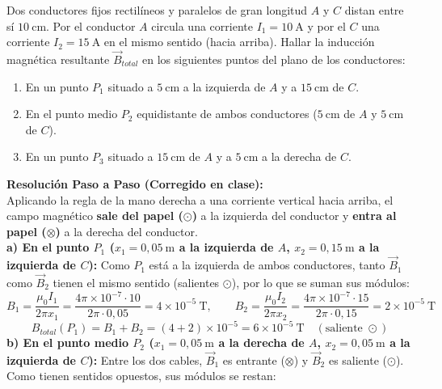 \begin{ejercicio}
Dos conductores fijos rectilíneos y paralelos de gran longitud $A$ y $C$ distan entre sí $10\ \si{\centi\meter}$. Por el conductor $A$ circula una corriente $I_1 = 10\ \si{\ampere}$ y por el $C$ una corriente $I_2 = 15\ \si{\ampere}$ en el mismo sentido (hacia arriba). Hallar la inducción magnética resultante $\vec{B}_{total}$ en los siguientes puntos del plano de los conductores:
\begin{enumerate}[label=\alph*)]
    \item En un punto $P_1$ situado a $5\ \si{\centi\meter}$ a la izquierda de $A$ y a $15\ \si{\centi\meter}$ de $C$.
    \item En el punto medio $P_2$ equidistante de ambos conductores ($5\ \si{\centi\meter}$ de $A$ y $5\ \si{\centi\meter}$ de $C$).
    \item En un punto $P_3$ situado a $15\ \si{\centi\meter}$ de $A$ y a $5\ \si{\centi\meter}$ a la derecha de $C$.
\end{enumerate}
\tcbline
\textbf{Resolución Paso a Paso (Corregido en clase):}\\[4pt]
Aplicando la regla de la mano derecha a una corriente vertical hacia arriba, el campo magnético \textbf{sale del papel ($\odot$)} a la izquierda del conductor y \textbf{entra al papel ($\otimes$)} a la derecha del conductor.\\[4pt]
\textbf{a) En el punto $P_1$ ($x_1 = 0{,}05\ \si{\meter}$ a la izquierda de $A$, $x_2 = 0{,}15\ \si{\meter}$ a la izquierda de $C$):}
Como $P_1$ está a la izquierda de ambos conductores, tanto $\vec{B}_1$ como $\vec{B}_2$ tienen el mismo sentido (salientes $\odot$), por lo que se suman sus módulos:
\begin{equation}
    B_1 = \frac{\mu_0 I_1}{2\pi x_1} = \frac{4\pi\times 10^{-7} \cdot 10}{2\pi \cdot 0{,}05} = 4 \times 10^{-5}\ \si{\tesla}, \qquad B_2 = \frac{\mu_0 I_2}{2\pi x_2} = \frac{4\pi\times 10^{-7} \cdot 15}{2\pi \cdot 0{,}15} = 2 \times 10^{-5}\ \si{\tesla}
\end{equation}
\begin{equation}
    B_{total}(P_1) = B_1 + B_2 = (4 + 2) \times 10^{-5} = 6 \times 10^{-5}\ \si{\tesla}\quad (\text{saliente }\odot)
\end{equation}
\textbf{b) En el punto medio $P_2$ ($x_1 = 0{,}05\ \si{\meter}$ a la derecha de $A$, $x_2 = 0{,}05\ \si{\meter}$ a la izquierda de $C$):}
Entre los dos cables, $\vec{B}_1$ es entrante ($\otimes$) y $\vec{B}_2$ es saliente ($\odot$). Como tienen sentidos opuestos, sus módulos se restan:

\end{ejercicio}
